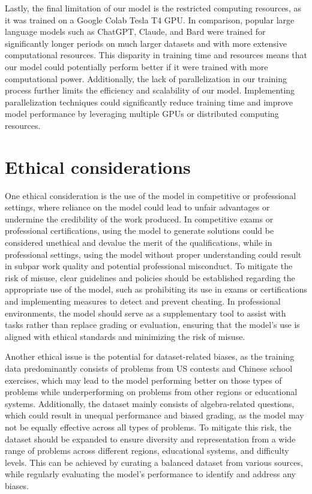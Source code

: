 \documentclass{article}
\begin{document}
Lastly, the final limitation of our model is the restricted computing resources, as it was trained on a Google Colab Tesla T4 GPU. In comparison, popular large language models such as ChatGPT, Claude, and Bard were trained for significantly longer periods on much larger datasets and with more extensive computational resources. This disparity in training time and resources means that our model could potentially perform better if it were trained with more computational power. Additionally, the lack of parallelization in our training process further limits the efficiency and scalability of our model. Implementing parallelization techniques could significantly reduce training time and improve model performance by leveraging multiple GPUs or distributed computing resources.


\section{Ethical considerations}



One ethical consideration is the use of the model in competitive or professional settings, where reliance on the model could lead to unfair advantages or undermine the credibility of the work produced. In competitive exams or professional certifications, using the model to generate solutions could be considered unethical and devalue the merit of the qualifications, while in professional settings, using the model without proper understanding could result in subpar work quality and potential professional misconduct. To mitigate the risk of misuse, clear guidelines and policies should be established regarding the appropriate use of the model, such as prohibiting its use in exams or certifications and implementing measures to detect and prevent cheating. In professional environments, the model should serve as a supplementary tool to assist with tasks rather than replace grading or evaluation, ensuring that the model's use is aligned with ethical standards and minimizing the risk of misuse.

Another ethical issue is the potential for dataset-related biases, as the training data predominantly consists of problems from US contests and Chinese school exercises, which may lead to the model performing better on those types of problems while underperforming on problems from other regions or educational systems. Additionally, the dataset mainly consists of algebra-related questions, which could result in unequal performance and biased grading, as the model may not be equally effective across all types of problems. To mitigate this risk, the dataset should be expanded to ensure diversity and representation from a wide range of problems across different regions, educational systems, and difficulty levels. This can be achieved by curating a balanced dataset from various sources, while regularly evaluating the model's performance to identify and address any biases.
\end{document}
